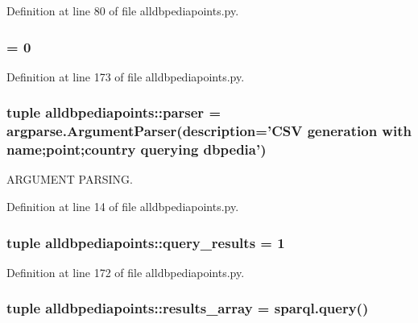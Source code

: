 \-Definition at line 80 of file alldbpediapoints.\-py.

\hypertarget{namespacealldbpediapoints_ab7c98613bae9215521f07b8219c81bcc}{
\subsubsection[{offset}]{ = 0}}\label{namespacealldbpediapoints_ab7c98613bae9215521f07b8219c81bcc}


\-Definition at line 173 of file alldbpediapoints.\-py.

\hypertarget{namespacealldbpediapoints_adf8df4e9e7647db7138cbc856f138d08}{
\subsubsection[{parser}]{\setlength{\rightskip}{0pt plus 5cm}tuple {\bf alldbpediapoints\-::parser} = argparse.\-Argument\-Parser(description='\-C\-S\-V generation with name;point;country querying dbpedia')}}\label{namespacealldbpediapoints_adf8df4e9e7647db7138cbc856f138d08}


\-A\-R\-G\-U\-M\-E\-N\-T \-P\-A\-R\-S\-I\-N\-G. 



\-Definition at line 14 of file alldbpediapoints.\-py.

\hypertarget{namespacealldbpediapoints_a68f0d6010ae0d06cda635211083677a5}{
\subsubsection[{query\-\_\-results}]{\setlength{\rightskip}{0pt plus 5cm}tuple {\bf alldbpediapoints\-::query\-\_\-results} = 1}}\label{namespacealldbpediapoints_a68f0d6010ae0d06cda635211083677a5}


\-Definition at line 172 of file alldbpediapoints.\-py.

\hypertarget{namespacealldbpediapoints_a806e39dd7996f0e6701f925654922fc9}{
\subsubsection[{results\-\_\-array}]{\setlength{\rightskip}{0pt plus 5cm}tuple {\bf alldbpediapoints\-::results\-\_\-array} = sparql.\-query()}}\label{namespacealldbpediapoints_a806e39dd7996f0e6701f925654922fc9}


